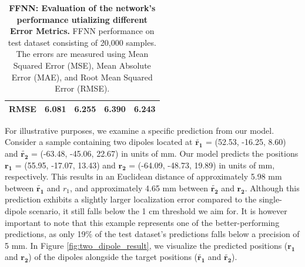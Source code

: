 \documentclass[a4paper, UKenglish, 11pt]{uiomaster}
\begin{document}
\begin{table}[!htb]
\begin{tabular}{l|cccc|}
\multicolumn{1}{|l|}{\cellcolor[HTML]{EFEFEF}RMSE} & \multicolumn{1}{c|}{6.081}                                                                                  & \multicolumn{1}{c|}{6.255}                                                                                   & \multicolumn{1}{c|}{6.390}                                                                                   & 6.243                                                                                                              \\ \hline
\end{tabular}
\caption{\textbf{FFNN: Evaluation of the network's performance utializing different Error Metrics.} \newline
FFNN performance on test dataset consisting of 20,000 samples. The errors are measured using Mean Squared Error (MSE), Mean Absolute Error (MAE), and Root Mean Squared Error (RMSE).}
\label{table:error_multiple_dipoles}
\end{table}

For illustrative purposes, we examine a specific prediction from our model. Consider a sample containing two dipoles located at $\tilde{\mathbf{r_1}}$ = (52.53, -16.25, 8.60) and $\tilde{\mathbf{r_2}}$ = (-63.48, -45.06, 22.67) in units of mm. Our model predicts the positions $\mathbf{r_1}$ = (55.95, -17.07, 13.43) and $\mathbf{r_2}$ = (-64.09, -48.73, 19.89) in units of mm, respectively. This results in an Euclidean distance of approximately 5.98 mm between $\tilde{\mathbf{r_1}}$ and $r_1$, and approximately 4.65 mm between $\tilde{\mathbf{r_2}}$ and $\mathbf{r_2}$. Although this prediction exhibits a slightly larger localization error compared to the single-dipole scenario, it still falls below the 1 cm threshold we aim for. It is however important to note that this example represents one of the better-performing predictions, as only 19$\%$ of the test dataset's predictions falls below a precision of 5 mm. In Figure \ref{fig:two_dipole_result}, we visualize the predicted positions ($\mathbf{r_1}$ and $\mathbf{r_2}$) of the dipoles alongside the target positions ($\mathbf{\tilde{r_1}}$ and $\mathbf{\tilde{r_2}}$).
\end{document}
